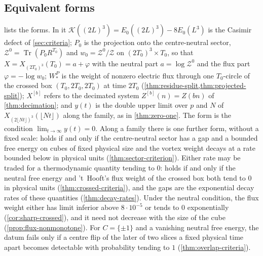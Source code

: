 \documentclass[11pt,a4paper]{amsart}
\theoremstyle{definition}
\theoremstyle{remark}
\numberwithin{equation}{section}
\DeclareMathOperator{\Tr}{Tr}        %
\newcommand{\TT}{\mathbb{T}}               %
\newcommand{\Zc}{\mathcal{Z}}              %
\newcommand{\XT}[2]{X_{#1}(#2)}            %
\newcommand{\cube}[1]{(2#1)^3}             %
\newcommand{\Mcirc}{\text{\upshape(M$^{\circ}$)}}   %
\newcommand{\hypY}{\text{\upshape(Y)}}              %
\begin{document}
\subsection*{Equivalent forms}
 lists the forms. In it $\mathcal K(\cube{L})=E_0(\cube{L})-8E_0(L^3)$ is the Casimir defect of \cref{sec:criteria}; $P_0$ is the projection onto the centre-neutral sector, $\Zc^0=\Tr(P_0R^{T_0})$ and $w_0=\Zc^0/\Zc$ on $\cube{T_0}\times T_0$, so that $X=\XT{\cube{T_0}}{T_0}=a+\varphi$ with the neutral part $a=\log\Zc^0$ and the flux part $\varphi=-\log w_0$; $W^P_*$ is the weight of nonzero electric flux through one $T_0$-circle of the crossed box $(T_0,2T_0,2T_0)$ at time $2T_0$ (\cref{thm:residue-split,thm:projected-split}); $X^{[b]}$ refers to the decimated system $Z^{[b]}(n)=Z(bn)$ of \cref{thm:decimation}; and $y(t)$ is the double upper limit over $p$ and $N$ of $\XT{\cube{\lfloor Nt\rfloor}}{\lfloor Nt\rfloor}$ along the family, as in \cref{thm:zero-one}. The form \hypY{} is the condition $\lim_{t\to\infty}y(t)=0$. Along a family there is one further form, without a fixed scale: \Mcirc{} holds if and only if the centre-neutral sector has a gap and a bounded free energy on cubes of fixed physical size and the vortex weight decays at a rate bounded below in physical units (\cref{thm:sector-criterion}). Either rate may be traded for a thermodynamic quantity tending to $0$: \Mcirc{} holds if and only if the neutral free energy and 't~Hooft's flux weight of the crossed box both tend to $0$ in physical units (\cref{thm:crossed-criteria}), and the gaps are the exponential decay rates of these quantities (\cref{thm:decay-rates}). Under the neutral condition, the flux weight either has limit inferior above $8\cdot10^{-5}$ or tends to $0$ exponentially (\cref{cor:sharp-crossed}), and it need not decrease with the size of the cube (\cref{prop:flux-nonmonotone}). For $C=\{\pm1\}$ and a vanishing neutral free energy, the datum fails only if a centre flip of the later of two slices a fixed physical time apart becomes detectable with probability tending to $1$ (\cref{thm:overlap-criteria}).
\end{document}
